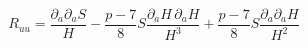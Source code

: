 \begin{equation}
R_{uu}=\frac{\partial _{a}\partial _{a}S}{H}-\frac{p-7}{8}S\frac{\partial
_{a}H\,\partial _{a}H}{H^{3}}+\frac{p-7}{8}S\frac{\partial _{a}\partial _{a}H%
}{H^{2}}
\end{equation}

